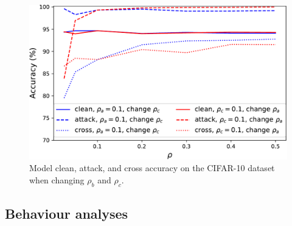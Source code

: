 \begin{center}
    \begin{figure}[h!]
    \begin{center}
     \includegraphics[scale=0.57]{figures/rho_figure.pdf}
    \end{center}
    \caption{Model clean, attack, and cross accuracy on the CIFAR-10 dataset when changing $\rho_b$ and $\rho_c$.}
    \label{fig:rho analysis}
    \end{figure}
    \vspace{-2mm}
\end{center}

\subsection{Behaviour analyses}

